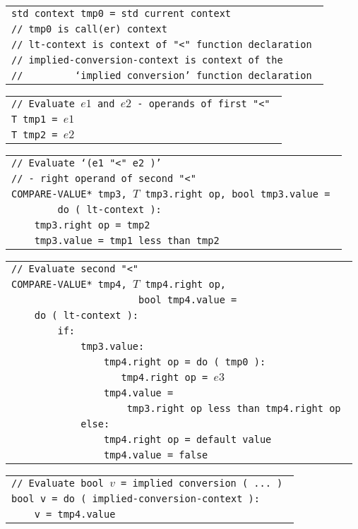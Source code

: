\documentclass[12pt]{article}
\newenvironment{indpar}[1][0.3in]%
	{\begin{list}{}%
		     {\setlength{\itemsep}{0in}%
		      \setlength{\topsep}{0in}%
		      \setlength{\parsep}{1ex}%
		      \setlength{\labelwidth}{#1}%
		      \setlength{\leftmargin}{#1}%
		      \addtolength{\leftmargin}{\labelsep}}%
	 \item}%
	{\end{list}}
\begin{document}
\begin{indpar}
\begin{tabular}{l}
\tt std context tmp0 = std current context \\
\tt // tmp0 is call(er) context \\
\tt // lt-context is context of "<" function declaration \\
\tt // implied-conversion-context is context of the \\
\tt // ~~~~~~~~`implied conversion' function declaration \\
\end{tabular}

\begin{tabular}{l}
\tt // Evaluate $e1$ and $e2$ - operands of first "<" \\
\tt T tmp1 = $e1$ \\
\tt T tmp2 = $e2$ \\
\end{tabular}

\begin{tabular}{l}
\tt // Evaluate `($e1$ "<" $e2$ )' \\
\tt // - right operand of second "<" \\
\tt *COMPARE-VALUE* tmp3, $T$ tmp3.right op, bool tmp3.value = \\
\tt ~~~~~~~~do ( lt-context ): \\
\tt ~~~~tmp3.right op = tmp2 \\
\tt ~~~~tmp3.value = tmp1 less than tmp2 \\
\end{tabular}

\begin{tabular}{l}
\tt // Evaluate second "<" \\
\tt *COMPARE-VALUE* tmp4, $T$ tmp4.right op,\\
\tt ~~~~~~~~~~~~~~~~~~~~~~bool tmp4.value = \\
\tt ~~~~do ( lt-context ): \\
\tt ~~~~~~~~if: \\
\tt ~~~~~~~~~~~~tmp3.value: \\
\tt ~~~~~~~~~~~~~~~~tmp4.right op = do ( tmp0 ): \\
\tt ~~~~~~~~~~~~~~~~~~~tmp4.right op = $e3$ \\
\tt ~~~~~~~~~~~~~~~~tmp4.value = \\
\tt ~~~~~~~~~~~~~~~~~~~~tmp3.right op less than tmp4.right op \\
\tt ~~~~~~~~~~~~else: \\
\tt ~~~~~~~~~~~~~~~~tmp4.right op = default value \\
\tt ~~~~~~~~~~~~~~~~tmp4.value = false \\
\end{tabular}

\begin{tabular}{l}
\tt // Evaluate bool $v$ = implied conversion ( ... ) \\
\tt bool v = do ( implied-conversion-context ): \\
\tt ~~~~v = tmp4.value \\
\end{tabular}

\end{indpar}
\end{document}

